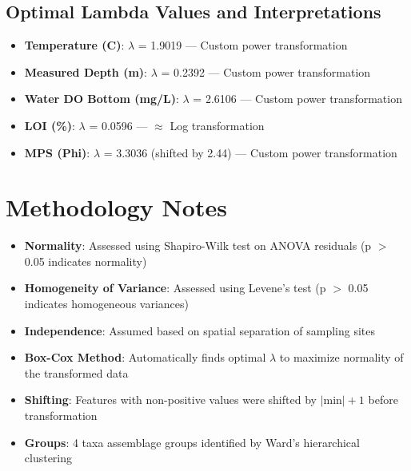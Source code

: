 \documentclass{article}
\begin{document}
\subsection{Optimal Lambda Values and Interpretations}

\begin{itemize}
    \item \textbf{Temperature (\textdegree{}C)}: $\lambda$ = 1.9019 --- Custom power transformation
    \item \textbf{Measured Depth (m)}: $\lambda$ = 0.2392 --- Custom power transformation
    \item \textbf{Water DO Bottom (mg/L)}: $\lambda$ = 2.6106 --- Custom power transformation
    \item \textbf{LOI (\%)}: $\lambda$ = 0.0596 --- $\approx$ Log transformation
    \item \textbf{MPS (Phi)}: $\lambda$ = 3.3036 (shifted by 2.44) --- Custom power transformation

\end{itemize}

\section{Methodology Notes}

\begin{itemize}
    \item \textbf{Normality}: Assessed using Shapiro-Wilk test on ANOVA residuals (p $>$ 0.05 indicates normality)
    \item \textbf{Homogeneity of Variance}: Assessed using Levene's test (p $>$ 0.05 indicates homogeneous variances)
    \item \textbf{Independence}: Assumed based on spatial separation of sampling sites
    \item \textbf{Box-Cox Method}: Automatically finds optimal $\lambda$ to maximize normality of the transformed data
    \item \textbf{Shifting}: Features with non-positive values were shifted by $|\text{min}| + 1$ before transformation
    \item \textbf{Groups}: 4 taxa assemblage groups identified by Ward's hierarchical clustering
\end{itemize}
\end{document}
